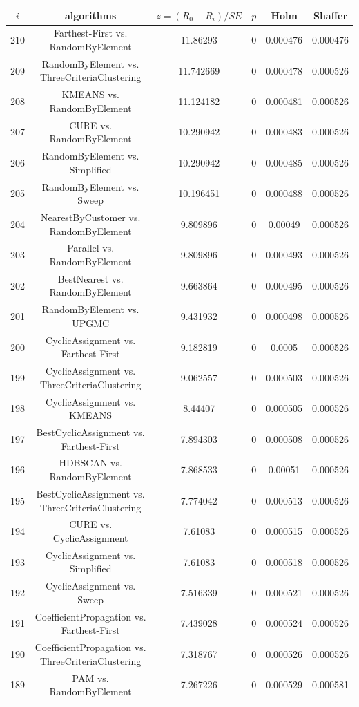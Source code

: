 \documentclass[a4paper,10pt]{article}
\begin{document}
\begin{landscape}
\begin{table}[!htp]
\centering\scriptsize
\begin{tabular}{cccccc}
$i$&algorithms&$z=(R_0 - R_i)/SE$&$p$&Holm&Shaffer\\
\hline210&Farthest-First vs. RandomByElement&11.86293&0&0.000476&0.000476\\
209&RandomByElement vs. ThreeCriteriaClustering&11.742669&0&0.000478&0.000526\\
208&KMEANS vs. RandomByElement&11.124182&0&0.000481&0.000526\\
207&CURE vs. RandomByElement&10.290942&0&0.000483&0.000526\\
206&RandomByElement vs. Simplified&10.290942&0&0.000485&0.000526\\
205&RandomByElement vs. Sweep&10.196451&0&0.000488&0.000526\\
204&NearestByCustomer vs. RandomByElement&9.809896&0&0.00049&0.000526\\
203&Parallel vs. RandomByElement&9.809896&0&0.000493&0.000526\\
202&BestNearest vs. RandomByElement&9.663864&0&0.000495&0.000526\\
201&RandomByElement vs. UPGMC&9.431932&0&0.000498&0.000526\\
200&CyclicAssignment vs. Farthest-First&9.182819&0&0.0005&0.000526\\
199&CyclicAssignment vs. ThreeCriteriaClustering&9.062557&0&0.000503&0.000526\\
198&CyclicAssignment vs. KMEANS&8.44407&0&0.000505&0.000526\\
197&BestCyclicAssignment vs. Farthest-First&7.894303&0&0.000508&0.000526\\
196&HDBSCAN vs. RandomByElement&7.868533&0&0.00051&0.000526\\
195&BestCyclicAssignment vs. ThreeCriteriaClustering&7.774042&0&0.000513&0.000526\\
194&CURE vs. CyclicAssignment&7.61083&0&0.000515&0.000526\\
193&CyclicAssignment vs. Simplified&7.61083&0&0.000518&0.000526\\
192&CyclicAssignment vs. Sweep&7.516339&0&0.000521&0.000526\\
191&CoefficientPropagation vs. Farthest-First&7.439028&0&0.000524&0.000526\\
190&CoefficientPropagation vs. ThreeCriteriaClustering&7.318767&0&0.000526&0.000526\\
189&PAM vs. RandomByElement&7.267226&0&0.000529&0.000581\\

\end{tabular}
\end{table}
\end{landscape}
\end{document}
